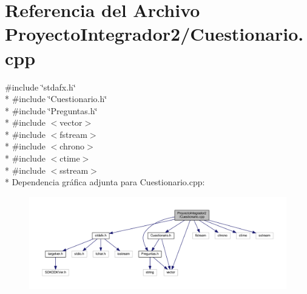 \section{Referencia del Archivo Proyecto\-Integrador2/\-Cuestionario.cpp}
\label{_cuestionario_8cpp}
{\ttfamily \#include \char`\"{}stdafx.\-h\char`\"{}}\\*
{\ttfamily \#include \char`\"{}Cuestionario.\-h\char`\"{}}\\*
{\ttfamily \#include \char`\"{}Preguntas.\-h\char`\"{}}\\*
{\ttfamily \#include $<$vector$>$}\\*
{\ttfamily \#include $<$fstream$>$}\\*
{\ttfamily \#include $<$chrono$>$}\\*
{\ttfamily \#include $<$ctime$>$}\\*
{\ttfamily \#include $<$sstream$>$}\\*
Dependencia gráfica adjunta para Cuestionario.\-cpp\-:
\nopagebreak
\begin{figure}[H]
\begin{center}
\leavevmode
\includegraphics[width=350pt]{_cuestionario_8cpp__incl}
\end{center}
\end{figure}
